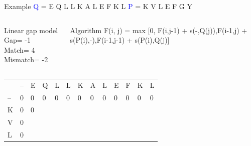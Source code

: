 \documentclass{bredelebeamer}
\begin{document}
 \begin{frame}{Example}
     \centering
 \textcolor{blue}{Q} = E Q L L K A L E F K L \quad \textcolor{blue}{P} = K V L E F G Y
\begin{columns}
\begin{block}{Linear gap model} 
Gap= -1 \\
Match= 4 \\
Mismatch= -2
\end{block}
\begin{block}{Algorithm}
 F(i, j) =  max [0, F(i,j-1) + s(-,Q(j)),F(i-1,j) + s(P(i),-),F(i-1,j-1) + s(P(i),Q(j)]
\end{block}

\end{columns}
     
     \begin{table}[]
\centering
\begin{tabular}{*{13}{p{0.4cm}}}
                        & --                     & \cellcolor[HTML]{FF0000}E                      & Q                      & L                      & L                      & K                      & A                      & L                      & E                      & F                      & K                      & L                      \\ \cline{2-13} 
\multicolumn{1}{l|}{--} & \multicolumn{1}{l|}{0} & \multicolumn{1}{l|}{0} & \multicolumn{1}{l|}{0} & \multicolumn{1}{l|}{0} & \multicolumn{1}{l|}{0} & \multicolumn{1}{l|}{0} & \multicolumn{1}{l|}{0} & \multicolumn{1}{l|}{0} & \multicolumn{1}{l|}{0} & \multicolumn{1}{l|}{0} & \multicolumn{1}{l|}{0} & \multicolumn{1}{l|}{0} \\ \cline{2-13} 
\multicolumn{1}{l|}{\cellcolor[HTML]{FFFF00}K}  & \multicolumn{1}{l|}{0} & \multicolumn{1}{l|}{0}  & \multicolumn{1}{l|}{}  & \multicolumn{1}{l|}{}  & \multicolumn{1}{l|}{}  & \multicolumn{1}{l|}{}  & \multicolumn{1}{l|}{}  & \multicolumn{1}{l|}{}  & \multicolumn{1}{l|}{}  & \multicolumn{1}{l|}{}  & \multicolumn{1}{l|}{}  & \multicolumn{1}{l|}{}  \\ \cline{2-13} 
\multicolumn{1}{l|}{V}  & \multicolumn{1}{l|}{0} & \multicolumn{1}{l|}{}  & \multicolumn{1}{l|}{}  & \multicolumn{1}{l|}{}  & \multicolumn{1}{l|}{}  & \multicolumn{1}{l|}{}  & \multicolumn{1}{l|}{}  & \multicolumn{1}{l|}{}  & \multicolumn{1}{l|}{}  & \multicolumn{1}{l|}{}  & \multicolumn{1}{l|}{}  & \multicolumn{1}{l|}{}  \\ \cline{2-13} 
\multicolumn{1}{l|}{L}  & \multicolumn{1}{l|}{0} & \multicolumn{1}{l|}{}  & \multicolumn{1}{l|}{}  & \multicolumn{1}{l|}{}  & \multicolumn{1}{l|}{}  & \multicolumn{1}{l|}{}  & \multicolumn{1}{l|}{}  & \multicolumn{1}{l|}{}  & \multicolumn{1}{l|}{}  & \multicolumn{1}{l|}{}  & \multicolumn{1}{l|}{}  & \multicolumn{1}{l|}{}  \\ \cline{2-13} 

\end{tabular}
\end{table}
\end{frame}
\end{document}
